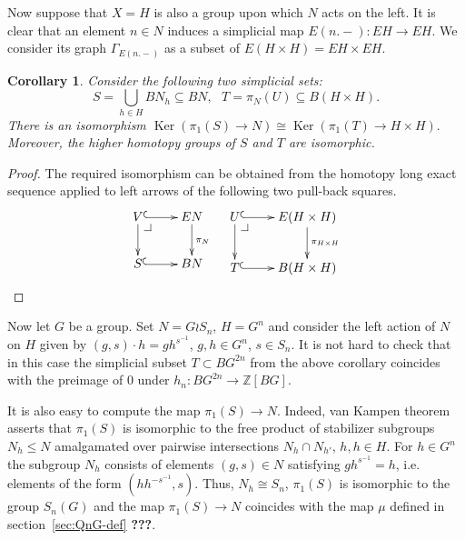 \documentclass[oneside, 12pt]{amsart}
\makeatletter
\theoremstyle{plain}
\numberwithin{equation}{section}
\numberwithin{lemma}{section}
\newtheorem{cor}[lemma]{Corollary}
\theoremstyle{remark}
\theoremstyle{definition}
\DeclareMathOperator{\Ker}{Ker}
\newcommand{\ZZ}{\mathbb{Z}}
\newcommand{\pullbackcorner}[1][dr]{\save*!/#1-1.2pc/#1:(-1,1)@^{|-}\restore}
\makeatother
\begin{document}
Now suppose that $X=H$ is also a group upon which $N$ acts on the left.
It is clear that an element $n \in N$ induces a simplicial map $E(n.-)\colon EH \to EH$.
We consider its graph $\Gamma_{E(n.-)}$ as a subset of $E(H \times H) = EH \times EH$.

\begin{cor} \label{cor:ker-iso}
Consider the following two simplicial sets:
\[ S = \bigcup\limits_{h\in H} BN_h \subseteq BN,\ \ \ T = \pi_N(U) \subseteq B(H \times H).\]
There is an isomorphism $\Ker(\pi_1(S) \to N) \cong \Ker(\pi_1(T) \to H \times H).$
Moreover, the higher homotopy groups of $S$ and $T$ are isomorphic. \end{cor}
\begin{proof}
The required isomorphism can be obtained from the homotopy long exact sequence applied to left arrows of the following two pull-back squares.
\[ \xymatrix{ V  \ar@{^{(}->}[r] \ar[d] \pullbackcorner & \ar[d]^{\pi_N} EN \\
              S \ar@{^{(}->}[r] & BN } \ \ \ 
   \xymatrix{ U  \ar@{^{(}->}[r] \ar[d] \pullbackcorner & \ar[d]^{\pi_{H \times H}} E(H \times H) \\
              T \ar@{^{(}->}[r] & B(H \times H)}  \] \end{proof}

Now let $G$ be a group. Set $N = G \wr S_n$, $H = G^n$ and consider the left action of $N$ on $H$ given by $(g, s) \cdot h = gh^{s^{-1}}$, $g, h\in G^n$, $s\in S_n$.
It is not hard to check that in this case the simplicial subset $T \subset BG^{2n}$ from the above corollary
 coincides with the preimage of $0$ under $h_n \colon BG^{2n} \to \ZZ[BG]$.

It is also easy to compute the map $\pi_1(S) \to N$. Indeed, van Kampen theorem~\cite[Theorem~2.7]{May99} asserts that
$\pi_1(S)$ is isomorphic to the free product of stabilizer subgroups $N_{h} \leq N$ amalgamated over pairwise intersections $N_h \cap N_{h'}$, $h, h\in H$.
For $h \in G^n$ the subgroup $N_h$ consists of elements $(g, s) \in N$ satisfying $gh^{s^{-1}} = h$, i.e. elements of the form $(hh^{-s^{-1}}, s)$.
Thus, $N_h\cong S_n$, $\pi_1(S)$ is isomorphic to the group $S_n(G)$ and the map $\pi_1(S) \to N$ coincides with the map $\mu$ defined in section~\ref{sec:QnG-def} {\bf ???}.
\end{document}
